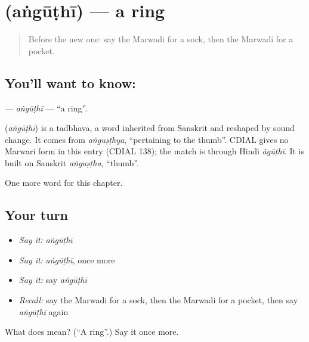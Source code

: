 \section[\texorpdfstring{\mw{अंगूठी} (aṅgūṭhī)}{अंगूठी (aṅgūṭhī)}]{ (aṅgūṭhī) — a ring}

\label{lesson:MW-C85-anguthi}



\begin{quote}
Before the new one: say the Marwadi for a sock, then the Marwadi for a pocket.
\end{quote}

\subsection*{You'll want to know: }
\textbf{} — \emph{aṅgūṭhī} — \textquotedblleft{}a ring\textquotedblright{}.

\begin{cousinweb}
\textbf{} (\emph{aṅgūṭhī}) is a tadbhava, a word inherited from Sanskrit and reshaped by sound change. It comes from \emph{aṅguṣṭhya}, \textquotedblleft{}pertaining to the thumb\textquotedblright{}. CDIAL gives no Marwari form in this entry (CDIAL 138); the match is through Hindi \emph{ãgūṭhī}. It is built on Sanskrit \emph{aṅguṣṭha}, \textquotedblleft{}thumb\textquotedblright{}.
\end{cousinweb}

\begin{grammarlens}[title={What you've built}]
One more word for this chapter.
\end{grammarlens}

\subsection*{Your turn}
\begin{itemize}
\raggedright
  \item \emph{Say it:} \emph{aṅgūṭhī}
  \item \emph{Say it:} \emph{aṅgūṭhī}, once more
  \item \emph{Say it:} say \emph{aṅgūṭhī}
  \item \emph{Recall:} say the Marwadi for a sock, then the Marwadi for a pocket, then say \emph{aṅgūṭhī} again
\end{itemize}

\begin{tcolorbox}[breakable,colback=teal!4,colframe=teal!35!black,title={Before you move on}]
What does  mean? (\textquotedblleft{}A ring\textquotedblright{}.) Say it once more.
\end{tcolorbox}
